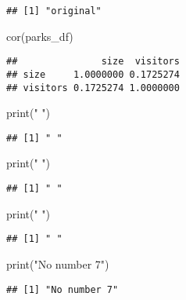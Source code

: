 \documentclass[
]{article}
\newenvironment{Shaded}{\begin{snugshade}}{\end{snugshade}}
\newcommand{\FunctionTok}[1]{\textcolor[rgb]{0.00,0.00,0.00}{#1}}
\newcommand{\NormalTok}[1]{#1}
\newcommand{\StringTok}[1]{\textcolor[rgb]{0.31,0.60,0.02}{#1}}
\begin{document}
\begin{verbatim}
## [1] "original"
\end{verbatim}

\begin{Shaded}
\begin{Highlighting}[]
\FunctionTok{cor}\NormalTok{(parks\_df)}
\end{Highlighting}
\end{Shaded}

\begin{verbatim}
##               size  visitors
## size     1.0000000 0.1725274
## visitors 0.1725274 1.0000000
\end{verbatim}

\begin{Shaded}
\begin{Highlighting}[]
\FunctionTok{print}\NormalTok{(}\StringTok{" "}\NormalTok{)}
\end{Highlighting}
\end{Shaded}

\begin{verbatim}
## [1] " "
\end{verbatim}

\begin{Shaded}
\begin{Highlighting}[]
\FunctionTok{print}\NormalTok{(}\StringTok{" "}\NormalTok{)}
\end{Highlighting}
\end{Shaded}

\begin{verbatim}
## [1] " "
\end{verbatim}

\begin{Shaded}
\begin{Highlighting}[]
\FunctionTok{print}\NormalTok{(}\StringTok{" "}\NormalTok{)}
\end{Highlighting}
\end{Shaded}

\begin{verbatim}
## [1] " "
\end{verbatim}

\begin{Shaded}
\begin{Highlighting}[]
\FunctionTok{print}\NormalTok{(}\StringTok{"No number 7"}\NormalTok{)}
\end{Highlighting}
\end{Shaded}

\begin{verbatim}
## [1] "No number 7"
\end{verbatim}
\end{document}

